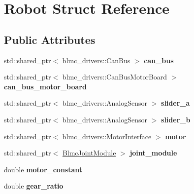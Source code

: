 \hypertarget{structRobot}{}\section{Robot Struct Reference}
\label{structRobot}
\subsection*{Public Attributes}
\begin{DoxyCompactItemize}
\item 
std\+::shared\+\_\+ptr$<$ blmc\+\_\+drivers\+::\+Can\+Bus $>$ {\bfseries can\+\_\+bus}\hypertarget{structRobot_a981e4452cbcb3f5d4ccab57c149cc996}{}\label{structRobot_a981e4452cbcb3f5d4ccab57c149cc996}

\item 
std\+::shared\+\_\+ptr$<$ blmc\+\_\+drivers\+::\+Can\+Bus\+Motor\+Board $>$ {\bfseries can\+\_\+bus\+\_\+motor\+\_\+board}\hypertarget{structRobot_a7130a31f454549ed9b499abdc750e263}{}\label{structRobot_a7130a31f454549ed9b499abdc750e263}

\item 
std\+::shared\+\_\+ptr$<$ blmc\+\_\+drivers\+::\+Analog\+Sensor $>$ {\bfseries slider\+\_\+a}\hypertarget{structRobot_a97a3f8855072318aadbd6bb4a2b3c797}{}\label{structRobot_a97a3f8855072318aadbd6bb4a2b3c797}

\item 
std\+::shared\+\_\+ptr$<$ blmc\+\_\+drivers\+::\+Analog\+Sensor $>$ {\bfseries slider\+\_\+b}\hypertarget{structRobot_a1e974a5b757e05045aefe528901812dc}{}\label{structRobot_a1e974a5b757e05045aefe528901812dc}

\item 
std\+::shared\+\_\+ptr$<$ blmc\+\_\+drivers\+::\+Motor\+Interface $>$ {\bfseries motor}\hypertarget{structRobot_a1f9d54a46141d3c38ca06fe85c92c50a}{}\label{structRobot_a1f9d54a46141d3c38ca06fe85c92c50a}

\item 
std\+::shared\+\_\+ptr$<$ \hyperlink{classblmc__robots_1_1BlmcJointModule}{Blmc\+Joint\+Module} $>$ {\bfseries joint\+\_\+module}\hypertarget{structRobot_abc53076359a6049c4fdd79906f7571ac}{}\label{structRobot_abc53076359a6049c4fdd79906f7571ac}

\item 
double {\bfseries motor\+\_\+constant}\hypertarget{structRobot_ace630f1abca285b60ad921b945764caf}{}\label{structRobot_ace630f1abca285b60ad921b945764caf}

\item 
double {\bfseries gear\+\_\+ratio}\hypertarget{structRobot_aae15cf10aaef0cd97d569a81232efe1e}{}\label{structRobot_aae15cf10aaef0cd97d569a81232efe1e}


\end{DoxyCompactItemize}
